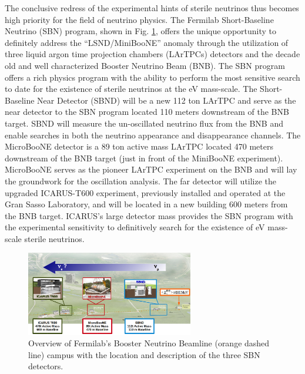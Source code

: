 \label{sec:IF_SBNintro}
The conclusive redress of the experimental hints of sterile neutrinos thus becomes high priority for the field of neutrino physics. The Fermilab Short-Baseline Neutrino (SBN) program, shown in Fig. \ref{fig:SBNMap}, offers the unique opportunity to definitely address the ``LSND/MiniBooNE'' anomaly through the utilization of three liquid argon time projection chambers (LArTPCs) detectors and the decade old and well characterized Booster Neutrino Beam (BNB). The SBN program offers a rich physics program with the ability to perform the most sensitive search to date for the existence of sterile neutrinos at the eV mass-scale. The Short-Baseline Near Detector (SBND) will be a new 112 ton LArTPC and serve as the near detector to the SBN program located 110 meters downstream of the BNB target. SBND will measure the un-oscillated neutrino flux from the BNB and enable searches in both the neutrino appearance and disappearance channels. The MicroBooNE detector is a 89 ton active mass LArTPC located 470 meters downstream of the BNB target (just in front of the MiniBooNE experiment). MicroBooNE serves as the pioneer LArTPC experiment on the BNB and will lay the groundwork for the oscillation analysis. The far detector will utilize the upgraded ICARUS-T600 experiment, previously installed and operated at the Gran Sasso Laboratory, and will be located in a new building 600 meters from the BNB target. ICARUS's large detector mass provides the SBN program with the experimental sensitivity to definitively search for the existence of eV mass-scale sterile neutrinos.

\begin{figure}[htb]
\centering
\includegraphics[width=0.65\textwidth]{images/SBNLayout2.png}
\caption[]{Overview of Fermilab's Booster Neutrino Beamline (orange dashed line) campus with the location and description of the three SBN detectors.}
\label{fig:SBNMap}
\end{figure}

